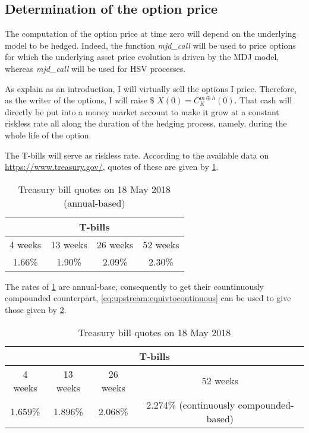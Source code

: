 \documentclass[12pt,a4paper]{report}
\begin{document}
\subsection{Determination of the option price}
\label{sec:methodology:determination}

The computation of the option price at time zero will depend on the underlying model to be hedged.
Indeed, the function \textit{mjd\_call} will be used to price options for which the underlying asset price evolution is driven by the MDJ model, whereas \textit{mjd\_call} will be used for HSV processes.

As explain as an introduction, I will virtually sell the options I price.
Therefore, as the writer of the options, I will raise \$ $X(0) = C_K^{m \oplus h} (0)$.
That cash will directly be put into a money market account to make it grow at a constant riskless rate all along the duration of the hedging process, namely, during the whole life of the option.

The T-bills will serve as riskless rate. According to the available data on \url{https://www.treasury.gov/}, quotes of these are given by \cref{tab:methodology:Tbill}.

\begin{table}[h]
\centering
\begin{tabular}{cccc}
  \hline
  \multicolumn{4}{c}{T-bills} \\
  \hline
  4 weeks & 13 weeks & 26 weeks & 52 weeks \\
  1.66\% & 1.90\% & 2.09\% & 2.30\% \\
  \hline
\end{tabular}
\caption{Treasury bill quotes on 18 May 2018 (annual-based)} 
\label{tab:methodology:Tbill}
\end{table}

The rates of \cref{tab:methodology:Tbill} are annual-base, consequently to get their countinuously compounded counterpart, \cref{eq:upstream:equivtocontinuous} can be used to give those given by \cref{tab:methodology:Tbill:compound}.


\begin{table}[h]
\centering
\begin{tabular}{cccc}
  \hline
  \multicolumn{4}{c}{T-bills} \\
  \hline
  4 weeks & 13 weeks & 26 weeks & 52 weeks \\
  1.659\% & 1.896\% & 2.068\% & 2.274\% (continuously compounded-based)\\
  \hline
\end{tabular}
\caption{Treasury bill quotes on 18 May 2018} 
\label{tab:methodology:Tbill:compound}
\end{table}
\end{document}
